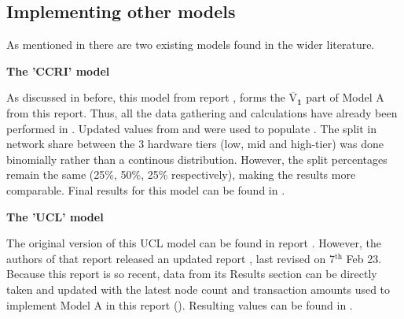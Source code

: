 \subsection{Implementing other models}

As mentioned in  there are two existing models found in the wider literature. 

\textbf{The 'CCRI' model} 

As discussed in  before, this model from report \cite{CryptoCarbonRatingsInstitute2022TheNetwork}, forms the $ \boldsymbol{\overline{\mathrm{V}}_{1}}$ part of Model A from this report. Thus, all the data gathering and calculations have already been performed in . Updated values from  and  were used to populate . The split in network share between the 3 hardware tiers (low, mid and high-tier) was done binomially rather than a continous distribution. However, the split percentages remain the same (25\%, 50\%, 25\% respectively), making the results more comparable. Final results for this model can be found in .

\textbf{The 'UCL' model} 

The original version of this UCL model can be found in report \cite{Platt2022TheProof-of-Work}. However, the authors of that report released an updated report \cite{IbanezTheExpansion}, last revised on 7$\mathrm{^{th}}$ Feb 23. Because this report is so recent, data from its Results section can be directly taken and updated with the latest node count and transaction amounts used to implement Model A in this report (). Resulting values can be found in . 


